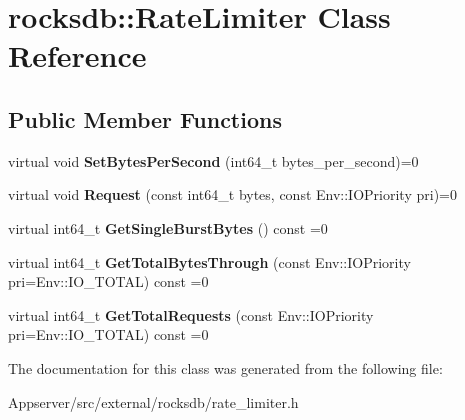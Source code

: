 \hypertarget{classrocksdb_1_1RateLimiter}{}\section{rocksdb\+:\+:Rate\+Limiter Class Reference}
\label{classrocksdb_1_1RateLimiter}
\subsection*{Public Member Functions}
\begin{DoxyCompactItemize}
\item 
virtual void {\bfseries Set\+Bytes\+Per\+Second} (int64\+\_\+t bytes\+\_\+per\+\_\+second)=0\hypertarget{classrocksdb_1_1RateLimiter_a53648ecfbbd85daa0966017b3a57ec44}{}\label{classrocksdb_1_1RateLimiter_a53648ecfbbd85daa0966017b3a57ec44}

\item 
virtual void {\bfseries Request} (const int64\+\_\+t bytes, const Env\+::\+I\+O\+Priority pri)=0\hypertarget{classrocksdb_1_1RateLimiter_a810573502b5fe0a1e97a9357eaee2abf}{}\label{classrocksdb_1_1RateLimiter_a810573502b5fe0a1e97a9357eaee2abf}

\item 
virtual int64\+\_\+t {\bfseries Get\+Single\+Burst\+Bytes} () const =0\hypertarget{classrocksdb_1_1RateLimiter_a4354ccb1bd11c7bf84210adb30544ce5}{}\label{classrocksdb_1_1RateLimiter_a4354ccb1bd11c7bf84210adb30544ce5}

\item 
virtual int64\+\_\+t {\bfseries Get\+Total\+Bytes\+Through} (const Env\+::\+I\+O\+Priority pri=Env\+::\+I\+O\+\_\+\+T\+O\+T\+AL) const =0\hypertarget{classrocksdb_1_1RateLimiter_a09bcea728c13012315223e3e08a18df0}{}\label{classrocksdb_1_1RateLimiter_a09bcea728c13012315223e3e08a18df0}

\item 
virtual int64\+\_\+t {\bfseries Get\+Total\+Requests} (const Env\+::\+I\+O\+Priority pri=Env\+::\+I\+O\+\_\+\+T\+O\+T\+AL) const =0\hypertarget{classrocksdb_1_1RateLimiter_a612909dc7934f497042312bfdb185844}{}\label{classrocksdb_1_1RateLimiter_a612909dc7934f497042312bfdb185844}

\end{DoxyCompactItemize}


The documentation for this class was generated from the following file\+:\begin{DoxyCompactItemize}
\item 
Appserver/src/external/rocksdb/rate\+\_\+limiter.\+h\end{DoxyCompactItemize}
